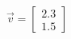 \documentclass[preview]{standalone}
\begin{document}
\begin{align*}
\vec{v}=\begin{bmatrix}2.3\\1.5\end{bmatrix}
\end{align*}
\end{document}
